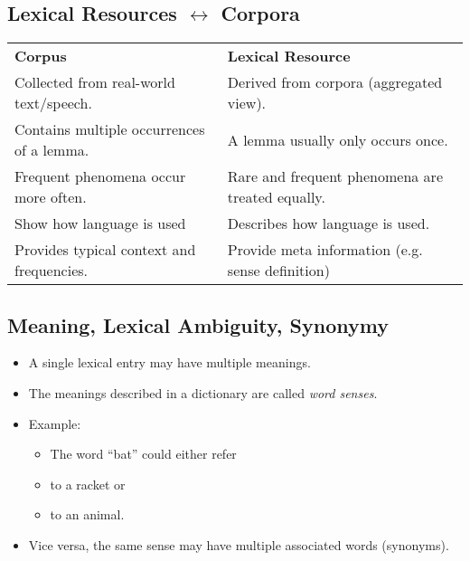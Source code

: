         \subsection{Lexical Resources \( \leftrightarrow \) Corpora} %
            \begin{table}[H]
            	\centering
            	\begin{tabular}{l l}
            		\textbf{Corpus}                           & \textbf{Lexical Resource}                        \\
            		Collected from real-world text/speech.    & Derived from corpora (aggregated view).          \\
            		Contains multiple occurrences of a lemma. & A lemma usually only occurs once.                \\
            		Frequent phenomena occur more often.      & Rare and frequent phenomena are treated equally. \\
            		Show how language is used                 & Describes how language is used.                  \\
            		Provides typical context and frequencies. & Provide meta information (e.g. sense definition)
            	\end{tabular}
            \end{table}

        \subsection{Meaning, Lexical Ambiguity, Synonymy} %
            \begin{itemize}
               	\item A single lexical entry may have multiple meanings.
               	\item The meanings described in a dictionary are called \textit{word senses}.
               	\item Example:
               		\begin{itemize}
               			\item The word \enquote{bat} could either refer
               			\item to a racket or
               			\item to an animal.
               		\end{itemize}
               	\item Vice versa, the same sense may have multiple associated words (synonyms).
            \end{itemize}

